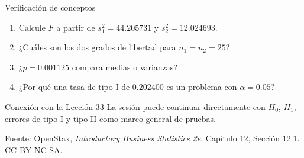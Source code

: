 \documentclass[aspectratio=169,10pt,spanish]{beamer}
\begin{document}
\begin{frame}{Verificación de conceptos}
  \begin{enumerate}
    \item Calcule $F$ a partir de $s_{1}^{2}=44.205731$ y $s_{2}^{2}=12.024693$.
    \item ¿Cuáles son los dos grados de libertad para $n_{1}=n_{2}=25$?
    \item ¿$p=0.001125$ compara medias o varianzas?
    \item ¿Por qué una tasa de tipo I de $0.202400$ es un problema con
      $\alpha=0.05$?
  \end{enumerate}

  \vspace{0.6em}
  \begin{block}{Conexión con la Lección 33}
    La sesión puede continuar directamente con $H_{0}$, $H_{1}$, errores de
    tipo I y tipo II como marco general de pruebas.
  \end{block}

  \vfill
  \scriptsize Fuente: OpenStax, \textit{Introductory Business Statistics 2e},
  Capítulo 12, Sección 12.1. CC BY-NC-SA.
\end{frame}

\appendix
\end{document}
